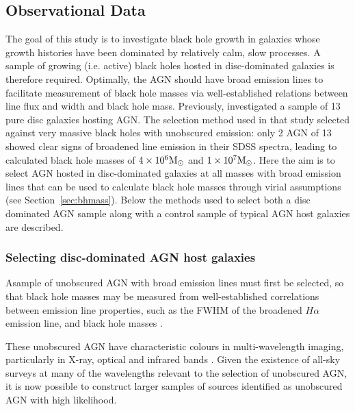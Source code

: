 %
%
\subsection{Observational Data}\label{sec:data}
%
%

The goal of this study is to investigate black hole growth in galaxies whose growth histories have been dominated by relatively calm, slow processes. A sample of growing (i.e. active) black holes hosted in disc-dominated galaxies is therefore required. Optimally, the AGN should have broad emission lines to facilitate measurement of black hole masses via well-established relations between line flux and width and black hole mass. Previously, \citet{Simmons13} investigated a sample of 13 pure disc galaxies hosting AGN. The selection method used in that study selected against very massive black holes with unobscured emission: only 2 AGN of 13 showed clear signs of broadened line emission in their SDSS spectra, leading to calculated black hole masses of $4 \times 10^6 \rm{M}_{\odot}$ and $1 \times 10^7 \rm{M}_{\odot} $. Here the aim is to select AGN hosted in disc-dominated galaxies at all masses with broad emission lines that can be used to calculate black hole masses through virial assumptions (see Section~\ref{sec:bhmass}). Below the methods used to select both a disc dominated AGN sample along with a control sample of typical AGN host galaxies are described.

\subsubsection{Selecting disc-dominated AGN host galaxies}\label{sec:selectAGN}%

Asample of unobscured AGN with broad emission lines must first be selected, so that black hole masses may be measured from well-established correlations between emission line properties, such as the FWHM of the broadened $H\alpha$ emission line, and black hole masses \citep[e.g.,][]{gh07a, jiang11a,xiao11, peterson14}. 

These unobscured AGN have characteristic colours in multi-wavelength imaging, particularly in X-ray, optical and infrared bands \citep{kauffmann03b, dstern05, goulding09, kauffmann09, aird12, mendez13, azadi16, cowley16, harrison16}. Given the existence of all-sky surveys at many of the wavelengths relevant to the selection of unobscured AGN, it is now possible to construct larger samples of sources identified as unobscured AGN with high likelihood.

